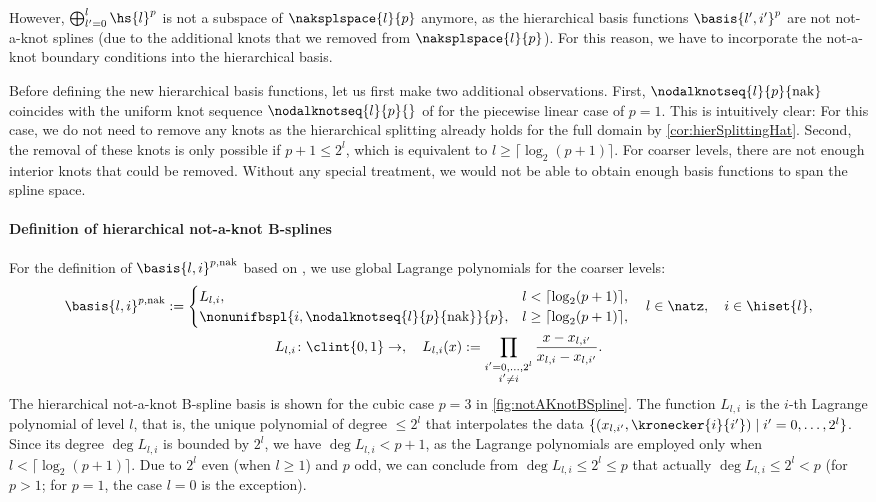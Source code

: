 However, $\bigoplus_{l'=0}^l \hs{l}^p$ is not a subspace of
$\naksplspace{l}{p}$ anymore,
as the hierarchical basis functions $\basis{l',i'}^p$ are not
not-a-knot splines (due to the additional knots that we removed from
$\naksplspace{l}{p}$).
For this reason,
we have to incorporate the not-a-knot boundary conditions into the
hierarchical basis.

Before defining the new hierarchical basis functions,
let us first make two additional observations.
First, $\nodalknotseq{l}{p}{\notaknot}$ coincides with the
uniform knot sequence $\nodalknotseq{l}{p}{}$ of 
for the piecewise linear case of $p = 1$.
This is intuitively clear:
For this case,
we do not need to remove any knots as the hierarchical splitting already
holds for the full domain by \cref{cor:hierSplittingHat}.
Second, the removal of these knots is only possible if $p + 1 \le 2^l$,
which is equivalent to $l \ge \lceil\log_2(p+1)\rceil$.
For coarser levels,
there are not enough interior knots that could be removed.
Without any special treatment,
we would not be able to obtain enough basis functions to span the spline space.

\paragraph{Definition of hierarchical not-a-knot B-splines}

%
For the definition of 
$\basis{l,i}^{p,\notaknot}$ based on ,
we use global Lagrange polynomials for the coarser levels:
\begin{subequations}
  \begin{gather}
    \basis{l,i}^{p,\notaknot}
    :=
    \begin{cases}
      L_{l,i},&
      l < \lceil\log_2(p+1)\rceil,\\
      \nonunifbspl{i,\nodalknotseq{l}{p}{\notaknot}}{p},&
      l \ge \lceil\log_2(p+1)\rceil,
    \end{cases}\quad
    l \in \natz,\quad
    i \in \hiset{l},\\
    L_{l,i}\colon \clint{0, 1} \to \real,\quad
    L_{l,i}(x)
    := \prod_{\substack{i'=0,\dotsc,2^l\\i'\not=i}}
    \frac{x - \gp{l,i'}}{\gp{l,i} - \gp{l,i'}}.
  \end{gather}
\end{subequations}
The hierarchical not-a-knot B-spline basis is shown for the
cubic case $p = 3$ in \cref{fig:notAKnotBSpline}.
The function $L_{l,i}$ is the $i$-th Lagrange polynomial of level $l$,
that is,
the unique polynomial of degree $\le 2^l$ that interpolates the data
$\{(\gp{l,i'}, \kronecker{i}{i'}) \mid i' = 0, \dotsc, 2^l\}$.
%
Since its degree $\deg L_{l,i}$ is bounded by $2^l$,
we have $\deg L_{l,i} < p + 1$,
as the Lagrange polynomials are employed only when
$l < \lceil\log_2(p+1)\rceil$.
Due to $2^l$ even (when $l \ge 1$) and $p$ odd,
we can conclude from $\deg L_{l,i} \le 2^l \le p$ that actually
$\deg L_{l,i} \le 2^l < p$
(for $p > 1$; for $p = 1$, the case $l = 0$ is the exception).

